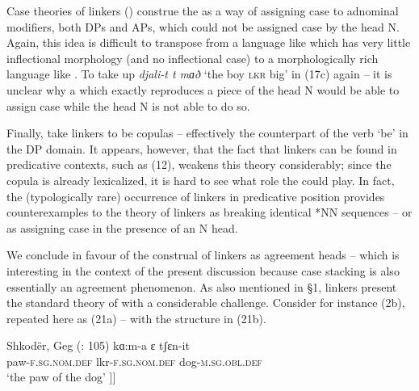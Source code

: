 \documentclass[output=paper]{langsci/langscibook}
\begin{document}
  Case theories of linkers (\citealt{Larson2008}) construe the  as a way of assigning case to adnominal modifiers, both DPs and APs, which could not be assigned case by the head N. Again, this idea is difficult to transpose from a language like  which has very little inflectional morphology (and no inflectional case) to a morphologically rich language like . To take up \textit{djali-t t mɑð} ‘the boy \textsc{lkr} big’ in (17c) again – it is unclear why a  which exactly reproduces a piece of the head N would be able to assign case while the head N is not able to do so.    

  Finally, \citet{Dikken2004} take linkers to be copulas – effectively the counterpart of the verb ‘be’ in the DP domain. It appears, however, that the fact that linkers can be found in predicative contexts, such as  (12), weakens this theory considerably; since the copula is already lexicalized, it is hard to see what role the  could play. In fact, the (typologically rare) occurrence of linkers in predicative position provides counterexamples to the theory of linkers as breaking identical *NN sequences – or as assigning case in the presence of an N head. 

  We conclude in favour of the construal of linkers as agreement heads – which is interesting in the context of the present discussion because case stacking is also essentially an agreement phenomenon. As also mentioned in §1, linkers present the standard theory of  with a considerable challenge. Consider for instance  (2b), repeated here as (21a) – with the structure in (21b).

\ea%
    \label{ex:manzini:21}
    \ea Shkodër, Geg  (\citealt{Manzini2011Reducing}: 105)
    \gll kɑ:m-a      ɛ          tʃɛn-it          \\
         paw-\textsc{f.sg.nom.def}   lkr-\textsc{f.sg.nom.def}  dog-\textsc{m.sg.obl.def} \\
    \glt ‘the paw of the dog’
    \ex\relax [\textsubscript{DP} kɑ:ma    [\textsubscript{Lkr} ɛ  [\textsubscript{DP} tʃɛnit ]]] 
    \z
\z
\end{document}
